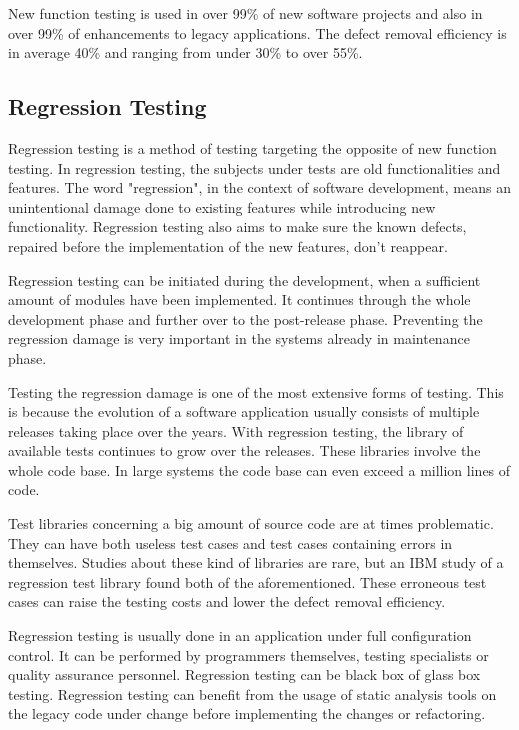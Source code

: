 New function testing is used in over 99\% of new software projects and also in over 99\% of enhancements to legacy applications. The defect removal efficiency is in average 40\% and ranging from under 30\% to over 55\%. 

 \subsection{Regression Testing}


Regression testing is a method of testing targeting the opposite of new function testing. In regression testing, the subjects under tests are old functionalities and features. The word "regression", in the context of software development, means an unintentional damage done to existing features while introducing new functionality. Regression testing also aims to make sure the known defects, repaired before the implementation of the new features, don't reappear.

Regression testing can be initiated during the development, when a sufficient amount of modules have been implemented. It continues through the whole development phase and further over to the post-release phase. Preventing the regression damage is very important in the systems already in maintenance phase.

Testing the regression damage is one of the most extensive forms of testing. This is because the evolution of a software application usually consists of multiple releases taking place over the years. With regression testing, the library of available tests continues to grow over the releases. These libraries involve the whole code base. In large systems the code base can even exceed a million lines of code.

Test libraries concerning a big amount of source code are at times problematic. They can have both useless test cases and test cases containing errors in themselves. Studies about these kind of libraries are rare, but an IBM study of a regression test library found both of the aforementioned. These erroneous test cases can raise the testing costs and lower the defect removal efficiency.

Regression testing is usually done in an application under full configuration control. It can be performed by programmers themselves, testing specialists or quality assurance personnel. Regression testing can be black box of glass box testing. Regression testing can benefit from the usage of static analysis tools on the legacy code under change before implementing the changes or refactoring.

